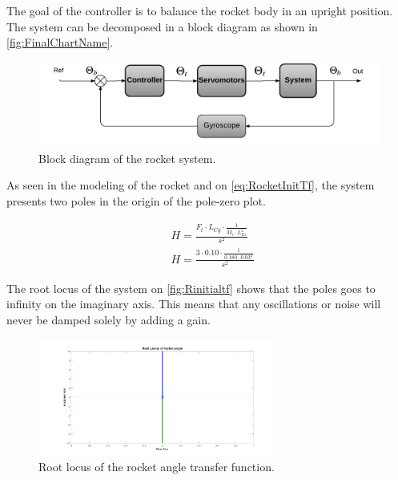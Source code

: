 \graphicspath{{figures/Rocket/design/}}

The goal of the controller is to balance the rocket body in an upright position. The system can be decomposed in a block diagram as shown in \autoref{fig:FinalChartName}.

\begin{figure}[htbp]
	\centering
	\includegraphics[width=\textwidth]{figures/Rocket/design/final_chart}
	\caption{Block diagram of the rocket system.}
	\label{fig:FinalChartName}
\end{figure}

As seen in the modeling of the rocket and on \autoref{eq:RocketInitTf}, the system presents two poles in the origin of the pole-zero plot. 

\begin{subequations}
	\begin{flalign}
		& H = \frac{F_t \cdot L_{Cg} \cdot \frac{1}{M_r \cdot L_{Es}^2}}{s^2}	\label{eq:RocketInitTf} \\
		& H = \frac{3 \cdot 0.10 \cdot \frac{1}{0.180 \cdot 0.03^2}}{s^2}
	\end{flalign}
\end{subequations}

The root locus of the system on \autoref{fig:Rinitialtf} shows that the poles goes to infinity on the imaginary axis. This means that any oscillations or noise will never be damped solely by adding a gain. 
\begin{figure}[htbp]
\centering
\includegraphics[width=0.7\textwidth]{figures/Rocket/design/initial_transfer_function_vf}
\caption{Root locus of the rocket angle transfer function.}
\label{fig:Rinitialtf}
\end{figure}

